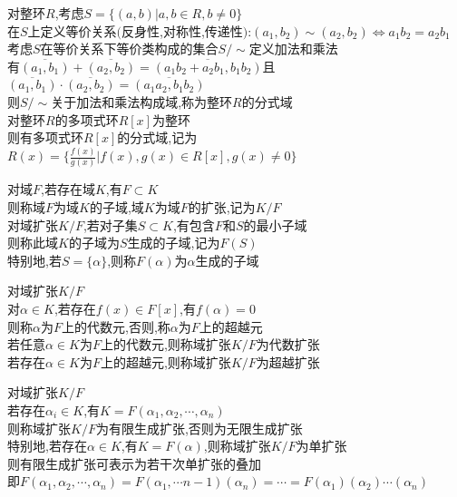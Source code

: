 \begin{dingyi}
对整环$R$,考虑$S=\{(a,b)|a,b\in R,b\neq 0\}$\\
在$S$上定义等价关系$($反身性,对称性,传递性$)$:$(a_1,b_2)\sim(a_2,b_2)$$\Leftrightarrow$$a_1b_2=a_2b_1$\\
考虑$S$在等价关系下等价类构成的集合$S/\sim$定义加法和乘法\\
有$\overline{(a_1,b_1)}+\overline{(a_2,b_2)}=\overline{(a_1b_2+a_2b_1,b_1b_2)}$且$\overline{(a_1,b_1)}\cdot\overline{(a_2,b_2)}=\overline{(a_1a_2,b_1b_2)}$\\
则$S/\sim$关于加法和乘法构成域,称为整环$R$的分式域\\
对整环$R$的多项式环$R[x]$为整环\\
则有多项式环$R[x]$的分式域,记为$R(x)=\{\frac{f(x)}{g(x)}|f(x),g(x)\in R[x],g(x)\neq 0\}$
\end{dingyi}

\begin{dingyi}
对域$F$,若存在域$K$,有$F\subset K$\\
则称域$F$为域$K$的子域,域$K$为域$F$的扩张,记为$K/F$\\
对域扩张$K/F$,若对子集$S\subset K$,有包含$F$和$S$的最小子域\\
则称此域$K$的子域为$S$生成的子域,记为$F(S)$\\
特别地,若$S=\{\alpha\}$,则称$F(\alpha)$为$\alpha$生成的子域
\end{dingyi}

\begin{dingyi}
对域扩张$K/F$\\
对$\alpha\in K$,若存在$f(x)\in F[x]$,有$f(\alpha)=0$\\
则称$\alpha$为$F$上的代数元,否则,称$\alpha$为$F$上的超越元\\
若任意$\alpha\in K$为$F$上的代数元,则称域扩张$K/F$为代数扩张\\
若存在$\alpha\in K$为$F$上的超越元,则称域扩张$K/F$为超越扩张
\end{dingyi}

\begin{dingyi}
对域扩张$K/F$\\
若存在$\alpha_i\in K$,有$K=F(\alpha_1,\alpha_2,\cdots,\alpha_n)$\\
则称域扩张$K/F$为有限生成扩张,否则为无限生成扩张\\
特别地,若存在$\alpha\in K$,有$K=F(\alpha)$,则称域扩张$K/F$为单扩张\\
则有限生成扩张可表示为若干次单扩张的叠加\\
即$F(\alpha_1,\alpha_2,\cdots,\alpha_n)=F(\alpha_1,\cdots{n-1})(\alpha_n)=\cdots=F(\alpha_1)(\alpha_2)\cdots(\alpha_n)$
\end{dingyi}

